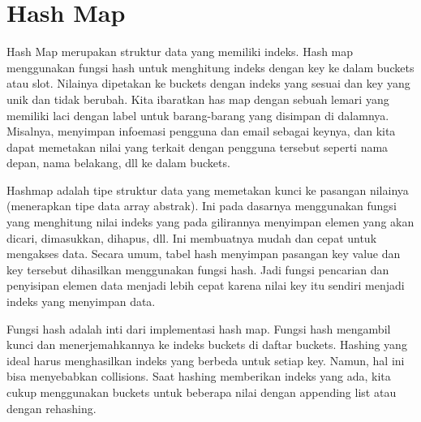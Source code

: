 \section{Hash Map}
Hash Map merupakan struktur data yang memiliki indeks. Hash map menggunakan fungsi hash untuk menghitung indeks dengan key ke dalam buckets atau slot. Nilainya dipetakan ke buckets dengan indeks yang sesuai dan key yang unik dan tidak berubah. Kita ibaratkan has map dengan sebuah lemari yang memiliki laci dengan label untuk barang-barang yang disimpan di dalamnya. Misalnya, menyimpan infoemasi pengguna dan email sebagai keynya, dan kita dapat memetakan nilai yang terkait dengan pengguna tersebut seperti nama depan, nama belakang, dll ke dalam buckets.

Hashmap adalah tipe struktur data yang memetakan kunci ke pasangan nilainya (menerapkan tipe data array abstrak). Ini pada dasarnya menggunakan fungsi yang menghitung nilai indeks yang pada gilirannya menyimpan elemen yang akan dicari, dimasukkan, dihapus, dll. Ini membuatnya mudah dan cepat untuk mengakses data. Secara umum, tabel hash menyimpan pasangan key value dan key tersebut dihasilkan menggunakan fungsi hash. Jadi fungsi pencarian dan penyisipan elemen data menjadi lebih cepat karena nilai key itu sendiri menjadi indeks yang menyimpan data.

Fungsi hash adalah inti dari implementasi hash map. Fungsi hash mengambil kunci dan menerjemahkannya ke indeks buckets di daftar buckets. Hashing yang ideal harus menghasilkan indeks yang berbeda untuk setiap key. Namun, hal ini bisa menyebabkan collisions. Saat hashing memberikan indeks yang ada, kita cukup menggunakan buckets untuk beberapa nilai dengan appending list atau dengan rehashing.

